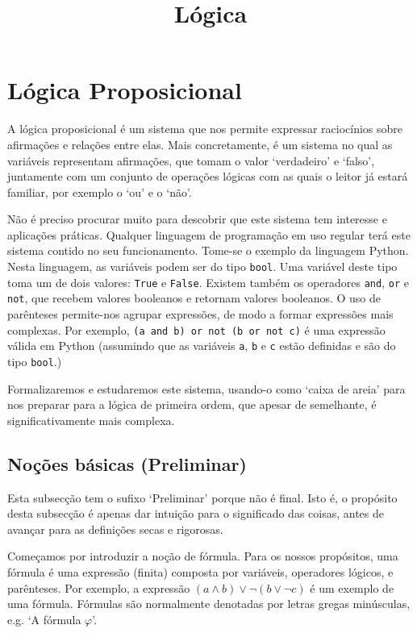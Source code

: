 \documentclass{report}
\title{Lógica}
\author{}
\date{}
\theoremstyle{definition}
\theoremstyle{remark}
\begin{document}
	\maketitle
	\newpage
	
	\tableofcontents
	\newpage
	
	\chapter{Lógica Proposicional}
	
	A lógica proposicional é um sistema que nos permite expressar raciocínios sobre afirmações e relações entre elas. Mais concretamente, é um sistema no qual as variáveis representam afirmações, que tomam o valor `verdadeiro' e `falso', juntamente com um conjunto de operações lógicas com as quais o leitor já estará familiar, por exemplo o `ou' e o `não'.
	
	Não é preciso procurar muito para descobrir que este sistema tem interesse e aplicações práticas. Qualquer linguagem de programação em uso regular terá este sistema contido no seu funcionamento. Tome-se o exemplo da linguagem Python. Nesta linguagem, as variáveis podem ser do tipo \texttt{bool}. Uma variável deste tipo toma um de dois valores: \texttt{True} e \texttt{False}. Existem também os operadores \texttt{and}, \texttt{or} e \texttt{not}, que recebem valores booleanos e retornam valores booleanos. O uso de parênteses permite-nos agrupar expressões, de modo a formar expressões mais complexas. Por exemplo, \texttt{(a and b) or not (b or not c)} é uma expressão válida em Python (assumindo que as variáveis \texttt{a}, \texttt{b} e \texttt{c} estão definidas e são do tipo \texttt{bool}.)
	
	Formalizaremos e estudaremos este sistema, usando-o como `caixa de areia' para nos preparar para a lógica de primeira ordem, que apesar de semelhante, é significativamente mais complexa.
	
	\section{Noções básicas (Preliminar)}
	
	Esta subsecção tem o sufixo `Preliminar' porque não é final. Isto é, o propósito desta subsecção é apenas dar intuição para o significado das coisas, antes de avançar para as definições secas e rigorosas.
	
	\bigskip
	
	Começamos por introduzir a noção de fórmula. Para os nossos propósitos, uma fórmula é uma expressão (finita) composta por variáveis, operadores lógicos, e parênteses. Por exemplo, a expressão $(a \land b) \lor \neg (b \lor \neg c)$ é um exemplo de uma fórmula. Fórmulas são normalmente denotadas por letras gregas minúsculas, e.g. `A fórmula $\varphi$'.
	
\end{document}
